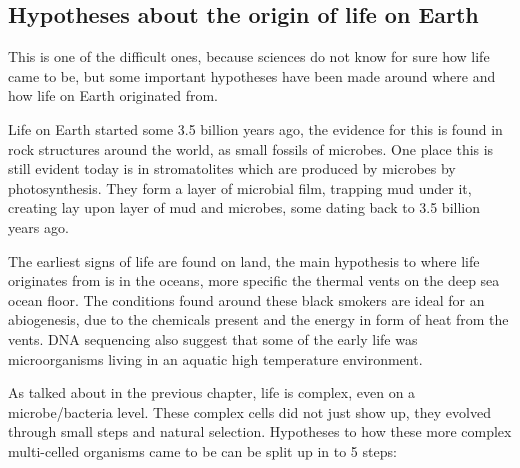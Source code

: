 \subsection{Hypotheses about the origin of life on Earth}
This is one of the difficult ones, because sciences do not know for sure how life came to be, but some important hypotheses have been made around where and how life on Earth originated from. \par
Life on Earth started some 3.5 billion years ago, the evidence for this is found in rock structures around the world, as small fossils of microbes. One place this is still evident today is in stromatolites which are produced by microbes by photosynthesis. They form a layer of microbial film, trapping mud under it, creating lay upon layer of mud and microbes, some dating back to 3.5 billion years ago. \par
The earliest signs of life are found on land, the main hypothesis to where life originates from is in the oceans, more specific the thermal vents on the deep sea ocean floor. The conditions found around these black smokers are ideal for an abiogenesis, due to the chemicals present and the energy in form of heat from the vents. DNA sequencing also suggest that some of the early life was microorganisms living in an aquatic high temperature environment. \par
As talked about in the previous chapter, life is complex, even on a microbe/bacteria level. These complex cells did not just show up, they evolved through small steps and natural selection. Hypotheses to how these more complex multi-celled organisms came to be can be split up in to 5 steps: \par

